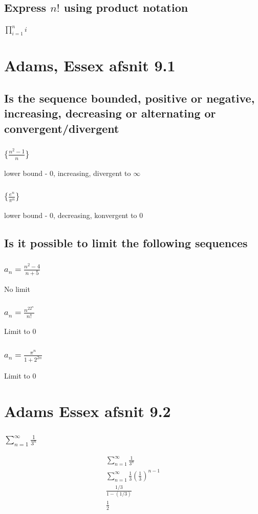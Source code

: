 \documentclass[12pt, a4paper]{report}
\begin{document}
				\subsection{Express $n!$ using product notation}
					$\prod\limits_{i=1}^n i$
			\section{Adams, Essex afsnit 9.1}
				\setcounter{subsection}{4}
				\subsection{Is the sequence bounded, positive or negative, increasing, decreasing or alternating or convergent/divergent}
					\subsubsection{$\{\frac{n^2-1}{n}\}$}
						lower bound - 0, increasing, divergent to $\infty$
					\subsubsection{$\{\frac{e^n}{\pi^n}\}$}
						lower bound -  0, decreasing, konvergent to 0
				\setcounter{subsection}{14}
				\subsection{Is it possible to limit the following sequences}
					\subsubsection{$a_n=\frac{n^2-4}{n+5}$}
						No limit
					\subsubsection{$a_n=\frac{n^22^n}{n!}$}
						Limit to 0
					\subsubsection{$a_n=\frac{\pi^n}{1+2^{2n}}$}
						Limit to 0
			\setcounter{section}{1}
			\section{Adams Essex afsnit 9.2}
			\subsubsection{$\sum_{n=1}^\infty\frac{1}{3^n}$}
				\begin{align*}
					\sum_{n=1}^\infty\frac{1}{3^n}\\
					\sum_{n=1}^\infty\frac{1}{3}(\frac{1}{3})^{n-1}\\
					\frac{1/3}{1-(1/3)}\\
					\frac{1}{2}
				\end{align*}
\end{document}
